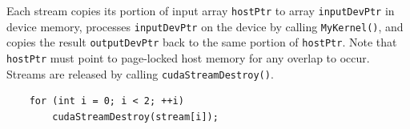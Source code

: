 	Each stream copies its portion of input array \texttt{hostPtr} to array \texttt{inputDevPtr} in device memory, processes \texttt{inputDevPtr} on the device by calling \texttt{MyKernel()}, and copies
	the result \texttt{outputDevPtr} back to the same portion of \texttt{hostPtr}. Note that \texttt{hostPtr} must point to page-locked host memory for any overlap to
	occur.\\
	Streams are released by calling \texttt{cudaStreamDestroy()}.
	\begin{lstlisting}
	for (int i = 0; i < 2; ++i)
		cudaStreamDestroy(stream[i]);
	\end{lstlisting}
	


	
